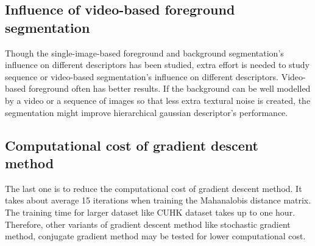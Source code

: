 \subsection{Influence of video-based foreground segmentation}
Though the single-image-based foreground and background segmentation's influence on different descriptors has been studied, extra effort is needed to study sequence or video-based segmentation's influence on different descriptors. Video-based foreground often has better results. If the background can be well modelled by a video or a sequence of images so that less extra textural noise is created, the segmentation might improve hierarchical gaussian descriptor's performance.
\subsection{Computational cost of gradient descent method}
The last one is to reduce the computational cost of gradient descent method. It takes about average 15 iterations when training the Mahanalobis distance matrix. The training time for larger dataset like CUHK dataset takes up to one hour. Therefore, other variants of gradient descent method like stochastic gradient method, conjugate gradient method may be tested for lower computational cost.



